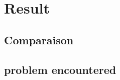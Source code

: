 \chapter{Result}
\label{ch:result}

\section{Comparaison}
\label{ch:result:comparaison}

\section{problem encountered}
\label{ch:result:problem}